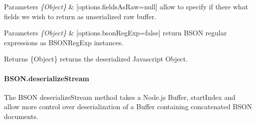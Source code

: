 \begin{DoxyItemize}
\begin{DoxyItemize}
\item 
\begin{DoxyParams}{Parameters}
{\em \{\+Object\}} & \mbox{[}options.\+fields\+As\+Raw=null\mbox{]} allow to specify if there what fields we wish to return as unserialized raw buffer.\\
\hline
\end{DoxyParams}

\item 
\begin{DoxyParams}{Parameters}
{\em \{\+Object\}} & \mbox{[}options.\+bson\+Reg\+Exp=false\mbox{]} return B\+S\+ON regular expressions as B\+S\+O\+N\+Reg\+Exp instances.\\
\hline
\end{DoxyParams}

\item \begin{DoxyReturn}{Returns}
\{Object\} returns the deserialized Javascript Object.
\end{DoxyReturn}
\paragraph*{B\+S\+O\+N.\+deserialize\+Stream}
\end{DoxyItemize}
\end{DoxyItemize}

The B\+S\+ON {\ttfamily deserialize\+Stream} method takes a Node.\+js Buffer, {\ttfamily start\+Index} and allow more control over deserialization of a Buffer containing concatenated B\+S\+ON documents.


